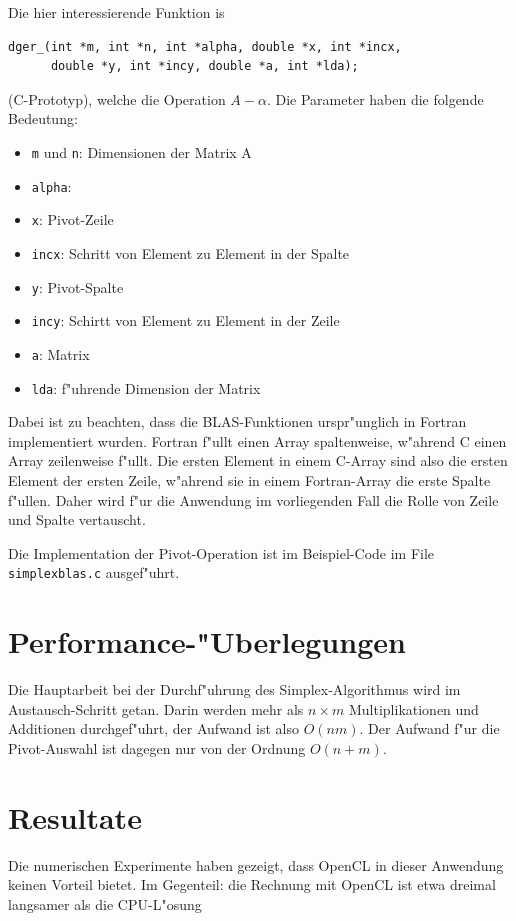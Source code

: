 Die hier interessierende Funktion is
\begin{verbatim}
dger_(int *m, int *n, int *alpha, double *x, int *incx,
      double *y, int *incy, double *a, int *lda);
\end{verbatim}
(C-Prototyp), welche die Operation $A-\alpha $. Die Parameter haben die folgende Bedeutung:
\begin{itemize}
\item {\tt m} und {\tt n}: Dimensionen der Matrix A
\item {\tt alpha}: 
\item {\tt x}: Pivot-Zeile
\item {\tt incx}: Schritt von Element zu Element in der Spalte 
\item {\tt y}: Pivot-Spalte
\item {\tt incy}: Schirtt von Element zu Element in der Zeile
\item {\tt a}: Matrix
\item {\tt lda}: f"uhrende Dimension der Matrix
\end{itemize}
Dabei ist zu beachten, dass die BLAS-Funktionen urspr"unglich in Fortran
implementiert wurden.
Fortran f"ullt einen Array spaltenweise, w"ahrend
C einen Array zeilenweise f"ullt.
Die ersten Element in einem C-Array sind also die ersten Element der
ersten Zeile, w"ahrend sie in einem Fortran-Array die erste Spalte
f"ullen. Daher wird f"ur die Anwendung im vorliegenden Fall die Rolle
von Zeile und Spalte vertauscht.

Die Implementation der Pivot-Operation ist im Beispiel-Code im
File {\tt simplexblas.c} ausgef"uhrt.

\section{Performance-"Uberlegungen}
Die Hauptarbeit bei der Durchf"uhrung des Simplex-Algorithmus wird im
Austausch-Schritt getan. Darin werden mehr als $n\times m$ Multiplikationen
und Additionen durchgef"uhrt, der Aufwand ist also $O(nm)$.
Der Aufwand f"ur die Pivot-Auswahl ist dagegen nur von der Ordnung
$O(n+m)$.

\section{Resultate}
Die numerischen Experimente haben gezeigt, dass OpenCL in dieser Anwendung
keinen Vorteil bietet. Im Gegenteil: die Rechnung mit OpenCL ist
etwa dreimal langsamer als die CPU-L"osung

